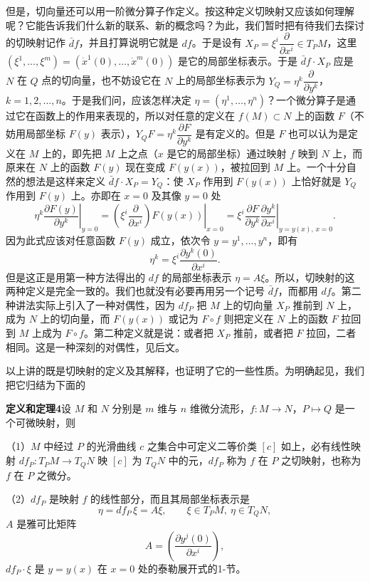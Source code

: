 但是，切向量还可以用一阶微分算子作定义。按这种定义切映射又应该如何理解呢？它能告诉我们什么新的联系、新的概念吗？为此，我们暂时把有待我们去探讨的切映射记作 $\bar d f$，并且打算说明它就是 $df$。于是设有 $X_P=\xi^i\dfrac{\partial}{\partial x^i}\in T_PM$，这里 $(\xi^1,\ldots,\xi^m)=(\dot x^1(0),\ldots,\dot x^m(0))$ 是它的局部坐标表示。于是 $\bar d f\cdot X_P$ 应是 $N$ 在 $Q$ 点的切向量，也不妨设它在 $N$ 上的局部坐标表示为 $Y_Q=\eta^k\dfrac{\partial}{\partial y^k}$，$k=1,2,\ldots,n$。于是我们问，应该怎样决定 $\eta=(\eta^1,\ldots,\eta^n)$？一个微分算子是通过它在函数上的作用来表现的，所以对任意的定义在 $f(M)\subset N$ 上的函数 $F$（不妨用局部坐标 $F(y)$ 表示），$Y_QF=\eta^k\dfrac{\partial F}{\partial y^k}$ 是有定义的。但是 $F$ 也可以认为是定义在 $M$ 上的，即先把 $M$ 上之点（$x$ 是它的局部坐标）通过映射 $f$ 映到 $N$ 上，而原来在 $N$ 上的函数 $F(y)$ 现在变成 $F(y(x))$，被拉回到 $M$ 上。一个十分自然的想法是这样来定义 $\bar d f\cdot X_P=Y_Q$：使 $X_P$ 作用到 $F(y(x))$ 上恰好就是 $Y_Q$ 作用到 $F(y)$ 上。亦即在 $x=0$ 及其像 $y=0$ 处
\[
 \left.\eta^k\frac{\partial F(y)}{\partial y^k}\right|_{y=0}
 =\left.\left(\xi^i\frac{\partial}{\partial x^i}\right)F(y(x))\right|_{x=0}
 =\left.\xi^i\frac{\partial F}{\partial y^k}\frac{\partial y^k}{\partial x^i}\right|_{y=y(x),\,x=0}.
\]
因为此式应该对任意函数 $F(y)$ 成立，依次令 $y=y^1,\ldots,y^n$，即有
\[
 \eta^k=\xi^i\frac{\partial y^k(0)}{\partial x^i}.
\]
但是这正是用第一种方法得出的 $df$ 的局部坐标表示 $\eta=A\xi$。所以，切映射的这两种定义是完全一致的。我们也就没有必要再用另一个记号 $\bar d f$，而都用 $df$。第二种讲法实际上引入了一种对偶性，因为 $df_P$ 把 $M$ 上的切向量 $X_P$ 推前到 $N$ 上，成为 $N$ 上的切向量，而 $F(y(x))$ 或记为 $F\circ f$ 则把定义在 $N$ 上的函数 $F$ 拉回到 $M$ 上成为 $F\circ f$。第二种定义就是说：或者把 $X_P$ 推前，或者把 $F$ 拉回，二者相同。这是一种深刻的对偶性，见后文。

以上讲的既是切映射的定义及其解释，也证明了它的一些性质。为明确起见，我们把它归结为下面的

\noindent\textbf{定义和定理4}\quad 设 $M$ 和 $N$ 分别是 $m$ 维与 $n$ 维微分流形，$f:M\to N$，$P\mapsto Q$ 是一个可微映射，则

（1）$M$ 中经过 $P$ 的光滑曲线 $c$ 之集合中可定义二等价类 $[c]$ 如上，必有线性映射 $df_P:T_PM\to T_QN$ 映 $[c]$ 为 $T_QN$ 中的元，$df_P$ 称为 $f$ 在 $P$ 之切映射，也称为 $f$ 在 $P$ 之微分。

（2）$df_P$ 是映射 $f$ 的线性部分，而且其局部坐标表示是
\begin{equation}
 \eta=df_P\,\xi=A\xi,
 \qquad \xi\in T_PM,\ \eta\in T_QN,
 \tag{24}
\end{equation}
$A$ 是雅可比矩阵
\[
 A=\left(\frac{\partial y^j(0)}{\partial x^i}\right),
\]
$df_P\cdot\xi$ 是 $y=y(x)$ 在 $x=0$ 处的泰勒展开式的1-节。

